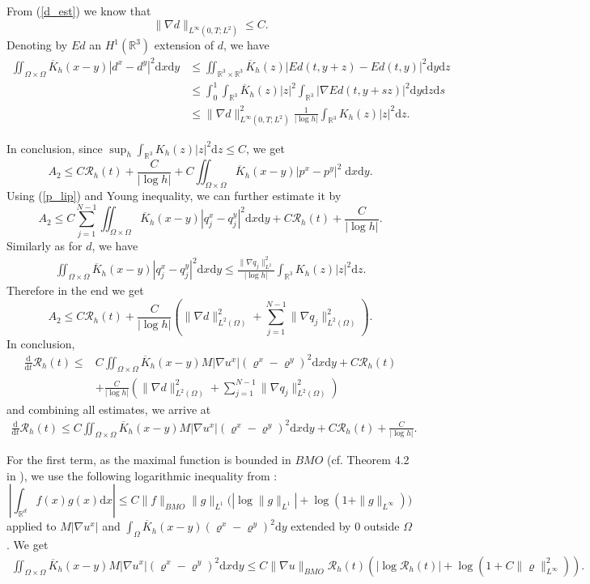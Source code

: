 \documentclass[11pt]{article}
\newcommand{\dd}{\mathrm{d}}
\numberwithin{equation}{section}
\numberwithin{tw}{section}
\begin{document}
From (\ref{d_est}) we know that 
\[ \|\nabla d\|_{L^\infty(0,T;L^2)}\leq C. \]
Denoting by $Ed$ an $H^1(\mathbb{R}^3)$ extension of $d$, we have
\[\begin{aligned} \iint_{\Omega\times\Omega} \overline{K}_h(x-y)|d^x-d^y|^2\dd x\dd y &\leq \iint_{\mathbb{R}^3\times\mathbb{R}^3} \overline{K}_h(z)|Ed(t,y+z)-Ed(t,y)|^2\dd y\dd z \\
& \leq \int_0^1\int_{\mathbb{R}^3} \overline{K}_h(z)|z|^2\int_{\mathbb{R}^3} |\nabla Ed(t,y+sz)|^2\dd y\dd z\dd s \\
& \leq \|\nabla d\|_{L^\infty(0,T;L^2)}^2\frac{1}{|\log h|}\int_{\mathbb{R}^3} K_h(z)|z|^2\dd z.
\end{aligned} \]

In conclusion, since $\displaystyle\sup_{h}\int_{\mathbb{R}^3}K_h(z)|z|^2\dd z\leq C$, we get
\[ A_2 \leq C\mathcal{R}_h(t) + \frac{C}{|\log h|} + C\iint_{\Omega\times\Omega}\overline{K}_h(x-y)|p^x-p^y|^2\;\dd x\dd y. \]
Using (\ref{p_lip}) and Young inequality, we can further estimate it by
\[ A_2 \leq C\sum_{j=1}^{N-1}\iint_{\Omega\times\Omega}\overline{K}_h(x-y)|q_j^x-q_j^y|^2\dd x\dd y + C\mathcal{R}_h(t) +\frac{C}{|\log h|}. \]
Similarly as for $d$, we have
\[\begin{aligned} \iint_{\Omega\times\Omega} \overline{K}_h(x-y)|q_j^x-q_j^y|^2\dd x\dd y \leq \frac{\|\nabla q_j\|_{L^2}^2}{|\log h|}\int_{\mathbb{R}^3} K_h(z)|z|^2\dd z.
\end{aligned} \]
Therefore in the end we get
\[ A_2 \leq C\mathcal{R}_h(t) + \frac{C}{|\log h|}\left(\|\nabla d\|_{L^2(\Omega)}^2+\sum_{j=1}^{N-1}\|\nabla q_j\|_{L^2(\Omega)}^2\right). \]
In conclusion, 
\[\begin{aligned} \frac{\dd}{\dd t}\mathcal{R}_h(t) \leq & C\iint_{\Omega\times\Omega} \overline{K}_h(x-y)M|\nabla u^x|(\varrho^x-\varrho^y)^2\dd x\dd y+ C\mathcal{R}_h(t) \\
&+ \frac{C}{|\log h|}\left(\|\nabla d\|_{L^2(\Omega)}^2+\sum_{j=1}^{N-1}\|\nabla q_j\|_{L^2(\Omega)}^2\right) \end{aligned}\]
and combining all estimates, we arrive at
\[\begin{aligned} \frac{\dd}{\dd t}\mathcal{R}_h(t) \leq C\iint_{\Omega\times\Omega} \overline{K}_h(x-y)M|\nabla u^x|(\varrho^x-\varrho^y)^2\dd x\dd y + C\mathcal{R}_h(t) + \frac{C}{|\log h|}. \end{aligned}\]

For the first term, as the maximal function is bounded in $BMO$ (cf. Theorem 4.2 in \cite{bmo_max}), we use the following logarithmic inequality from \cite{mucha-rusin}:
\[ \left|\int_{\mathbb{R}^d} f(x)g(x)\dd x\right| \leq C\|f\|_{BMO}\|g\|_{L^1}\big(|\log\|g\|_{L^1}|+\log(1+\|g\|_{L^\infty})\big) \]
applied to $M|\nabla u^x|$ and $\displaystyle\int_{\Omega} \overline{K}_h(x-y)(\varrho^x-\varrho^y)^2\dd y$ extended by $0$ outside $\Omega$. We get
\begin{multline*} \iint_{\Omega\times\Omega} \overline{K}_h(x-y)M|\nabla u^x|(\varrho^x-\varrho^y)^2\dd x\dd y
\leq C\|\nabla u\|_{BMO} \mathcal{R}_h(t)\left(|\log \mathcal{R}_h(t)| + \log(1+C\|\varrho\|_{L^\infty}^2)\right). \end{multline*}
\end{document}
